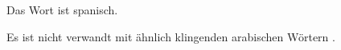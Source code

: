 \lipsum

Das Wort  ist spanisch.

\newpage
Es ist nicht verwandt mit ähnlich klingenden arabischen Wörtern .
\lipsum[10-14]
